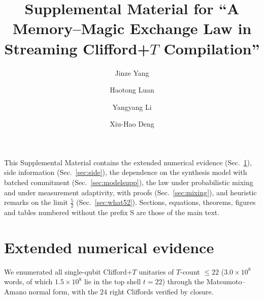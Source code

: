 \documentclass[aps,prx,twocolumn,superscriptaddress,nofootinbib,longbibliography]{revtex4-2}
\theoremstyle{plain}
\theoremstyle{definition}
\theoremstyle{remark}
\begin{document}
\title{Supplemental Material for ``A Memory--Magic Exchange Law in Streaming \texorpdfstring{Clifford+$T$}{Clifford+T} Compilation''}


\author{Jinze Yang}

\author{Haotong Luan}

\author{Yangyang Li}

\author{Xiu-Hao Deng}

\maketitle

This Supplemental Material contains the extended numerical evidence (Sec.~\ref{sec:numsupp}), side information (Sec.~\ref{sec:side}), the dependence on the synthesis model with batched commitment (Sec.~\ref{sec:modelsupp}), the law under probabilistic mixing and under measurement adaptivity, with proofs (Sec.~\ref{sec:mixing}), and heuristic remarks on the limit $\tfrac52$ (Sec.~\ref{sec:what52}). Sections, equations, theorems, figures and tables numbered without the prefix S are those of the main text.

\section{Extended numerical evidence}\label{sec:numsupp}


We enumerated all single-qubit Clifford+$T$ unitaries of $T$-count $\le22$ ($3.0\times10^8$ words, of which $1.5\times10^8$ lie in the top shell $t=22$) through the Matsumoto--Amano normal form, with the $24$ right Cliffords verified by closure.
\end{document}

